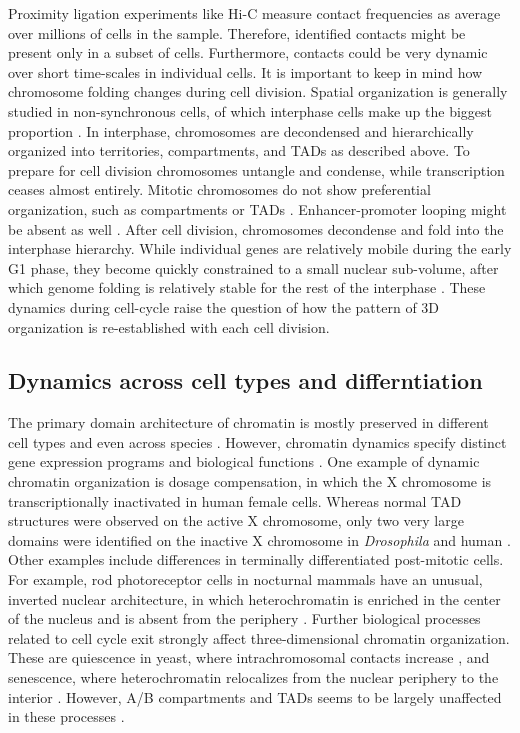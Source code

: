 \documentclass[a4paper,twoside=true,openright,parskip=full,chapterprefix=true,11pt,headings=normal,bibliography=totoc,listof=totoc,titlepage=on,captions=tableabove,draft=false]{scrreprt}
\theoremstyle{definition}
\theoremstyle{definition}
\theoremstyle{definition}
\theoremstyle{remark}
\begin{document}
Proximity ligation experiments like Hi-C measure contact frequencies as
average over millions of cells in the sample. Therefore, identified
contacts might be present only in a subset of cells. Furthermore,
contacts could be very dynamic over short time-scales in individual
cells. It is important to keep in mind how chromosome folding changes
during cell division. Spatial organization is generally studied in
non-synchronous cells, of which interphase cells make up the biggest
proportion \citep{Bouwman2015}. In interphase, chromosomes are
decondensed and hierarchically organized into territories, compartments,
and TADs as described above. To prepare for cell division chromosomes
untangle and condense, while transcription ceases almost entirely.
Mitotic chromosomes do not show preferential organization, such as
compartments or TADs \citep{Naumova2013}. Enhancer-promoter looping
might be absent as well \citep{Dekker2014}. After cell division,
chromosomes decondense and fold into the interphase hierarchy. While
individual genes are relatively mobile during the early G1 phase, they
become quickly constrained to a small nuclear sub-volume, after which
genome folding is relatively stable for the rest of the interphase
\citep{Chubb2002, Walter2003}. These dynamics during cell-cycle raise
the question of how the pattern of 3D organization is re-established
with each cell division.

\hypertarget{dynamics-across-cell-types-and-differntiation}{%
\subsection{Dynamics across cell types and
differntiation}\label{dynamics-across-cell-types-and-differntiation}}

The primary domain architecture of chromatin is mostly preserved in
different cell types and even across species \citep{Dixon2012, Rao2014}.
However, chromatin dynamics specify distinct gene expression programs
and biological functions \citep{Bonev2016}. One example of dynamic
chromatin organization is dosage compensation, in which the X chromosome
is transcriptionally inactivated in human female cells. Whereas normal
TAD structures were observed on the active X chromosome, only two very
large domains were identified on the inactive X chromosome in
\emph{Drosophila} and human \citep{Deng2015, Rao2014}. Other examples
include differences in terminally differentiated post-mitotic cells. For
example, rod photoreceptor cells in nocturnal mammals have an unusual,
inverted nuclear architecture, in which heterochromatin is enriched in
the center of the nucleus and is absent from the periphery
\citep{Solovei2013, Falk2018}. Further biological processes related to
cell cycle exit strongly affect three-dimensional chromatin
organization. These are quiescence in yeast, where intrachromosomal
contacts increase \citep{Rutledge2015}, and senescence, where
heterochromatin relocalizes from the nuclear periphery to the interior
\citep{Chandra2015}. However, A/B compartments and TADs seems to be
largely unaffected in these processes \citep{Criscione2016}.
\end{document}

